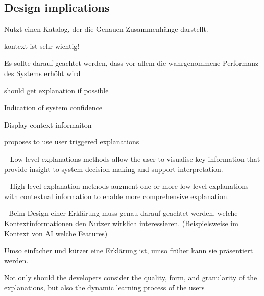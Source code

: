 \subsection{Design implications}

\cite{carvalho2020developers} Nutzt einen Katalog, der die Genauen Zusammenhänge darstellt.

kontext ist sehr wichtig! \cite{sato_context_nodate}

Es sollte darauf geachtet werden, dass vor allem die wahrgenommene Performanz des Systems erhöht wird \cite{riveiro_thats_2021}

should get explanation if possible \cite{wiegand_id_2020}

Indication of system confidence \cite{wiegand_id_2020, golledge1999wayfinding}

Display context informaiton \cite{wiegand_id_2020}

\cite{weitz_you_2019} proposes to use user triggered explanations

– Low-level explanations methods allow the user to visualise key information that provide insight to system decision-making and support interpretation. \cite{martin_evaluating_2021}

– High-level explanation methods augment one or more low-level explanations with contextual information to enable more comprehensive explanation. \cite{martin_evaluating_2021}

- Beim Design einer Erklärung muss genau darauf geachtet werden, welche Kontextinformationen den Nutzer wirklich interessieren. (Beispielsweise im Kontext von AI welche Features) \cite{rjoob_towards_2021}

Umso einfacher und kürzer eine Erklärung ist, umso früher kann sie präsentiert werden. \cite{hleg2019policy, sovrano_modelling_2020}

\glqq Not only should the developers consider the quality, form, and granularity of the explanations, but also the dynamic learning process of the users \grqq{} \cite{wang_integration_2020}
